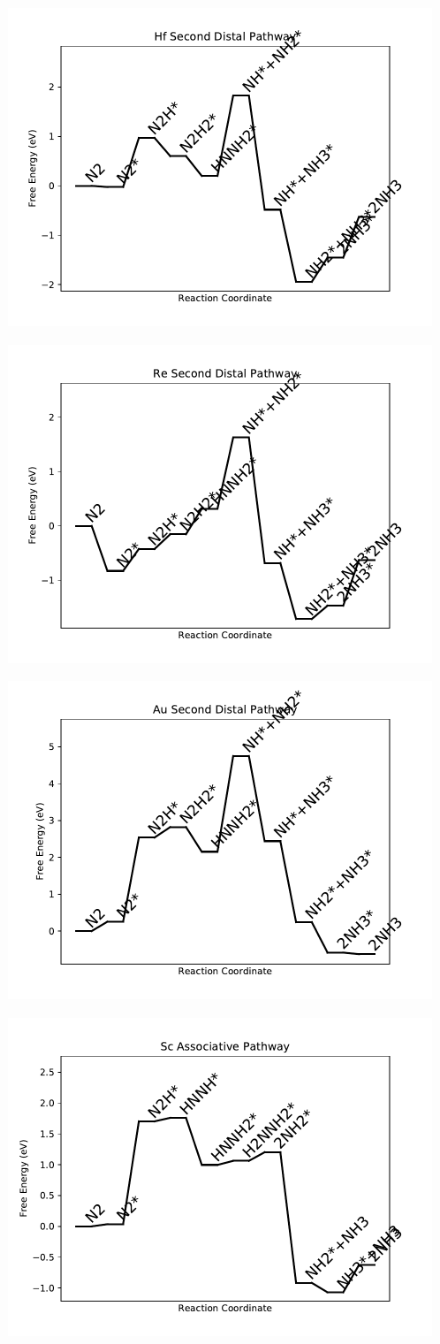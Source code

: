 \documentclass[journal=jacsat,manuscript=article]{achemso}
\begin{document}
\begin{figure}
\includegraphics[width=0.5\linewidth]{data/plots/Hf_distal_2.pdf}
\label{fig:Hf_distal_2}
\end{figure}

\newpage
\begin{figure}
\includegraphics[width=0.5\linewidth]{data/plots/Re_distal_2.pdf}
\label{fig:Re_distal_2}
\end{figure}

\begin{figure}
\includegraphics[width=0.5\linewidth]{data/plots/Au_distal_2.pdf}
\label{fig:Au_distal_2}
\end{figure}

\newpage
\begin{figure}
\includegraphics[width=0.5\linewidth]{data/plots/Sc_associative.pdf}
\label{fig:Sc_associative}
\end{figure}
\end{document}
